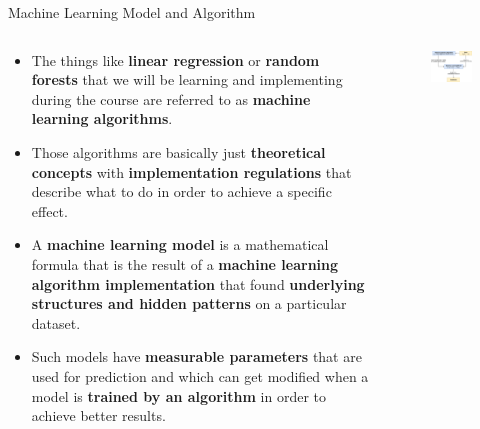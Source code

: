 \documentclass[main.tex]{subfiles}
\begin{document}
    \begin{frame}{Machine Learning Model and Algorithm}
        \begin{columns}
            \begin{column}{.6\textwidth}
                \begin{itemize}
                    \item The things like \textbf{linear regression} or \textbf{random forests} that we will be learning and implementing during the course are referred to as \textbf{machine learning algorithms}.
                    \item Those algorithms are basically just \textbf{theoretical concepts} with \textbf{implementation regulations} that describe what to do in order to achieve a specific effect.
                    \item A \textbf{machine learning model} is a mathematical formula that is the result of a \textbf{machine learning algorithm implementation} that found \textbf{underlying structures and hidden patterns} on a particular dataset.
                    \item Such models have \textbf{measurable parameters} that are used for prediction and which can get modified when a model is \textbf{trained by an algorithm} in order to achieve better results.  
                \end{itemize}
            \end{column}
            \begin{column}{.4\textwidth}
                \begin{figure}
                    \label{fig:machine-learning-model}
                    \includegraphics[width=\textwidth]{figures/drawio/machine-learning-model.png}
                \end{figure}
            \end{column}
        \end{columns}
    \end{frame}
\end{document}
